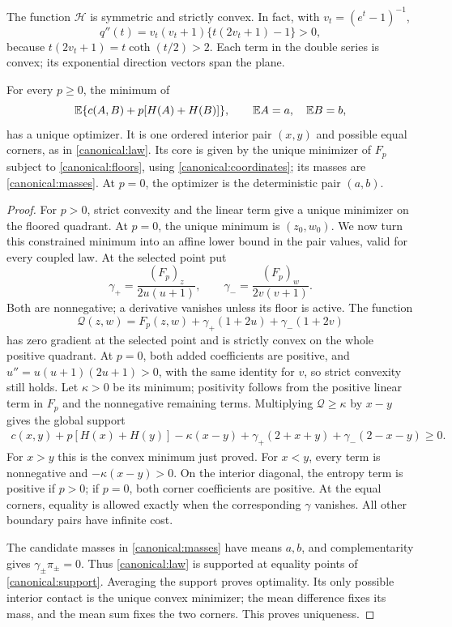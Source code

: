 The function $\mathcal H$ is symmetric and strictly convex.  In fact,
with $v_t=(e^t-1)^{-1}$,
\[
 q''(t)=v_t(v_t+1)\{t(2v_t+1)-1\}>0,
\]
because $t(2v_t+1)=t\coth(t/2)>2$.  Each term in the double series
is convex; its exponential direction vectors span the plane.

\begin{lemma}
\label{canonical:priced}
For every $p\ge0$, the minimum of
\[
 \mathbb E\{c(A,B)+p[H(A)+H(B)]\},
 \qquad \mathbb E A=a,\quad \mathbb E B=b,
\]
has a unique optimizer.  It is one ordered interior pair $(x,y)$
and possible equal corners, as in \eqref{canonical:law}. Its core is
given by the unique minimizer of $F_p$ subject to
\eqref{canonical:floors}, using \eqref{canonical:coordinates};
its masses are \eqref{canonical:masses}.
At $p=0$, the optimizer is the deterministic pair $(a,b)$.
\end{lemma}

\begin{proof}
For $p>0$, strict convexity and the linear term give a unique
minimizer on the floored quadrant.  At $p=0$, the unique minimum is
$(z_0,w_0)$. We now turn this constrained minimum into an affine
lower bound in the pair values, valid for every coupled law.
At the selected point put
\[
 \gamma_+=\frac{(F_p)_z}{2u(u+1)},\qquad
 \gamma_-=\frac{(F_p)_w}{2v(v+1)}.
\]
Both are nonnegative; a derivative vanishes unless its floor is active.
The function
\[
 \mathscr Q(z,w)=F_p(z,w)+\gamma_+(1+2u)+\gamma_-(1+2v)
\]
has zero gradient at the selected point and is strictly convex on the
whole positive quadrant.  At $p=0$, both added coefficients are
positive, and $u''=u(u+1)(2u+1)>0$, with the same identity for $v$,
so strict convexity still holds. Let $\kappa>0$ be its minimum;
positivity follows from the positive linear term in $F_p$ and the
nonnegative remaining terms.  Multiplying $\mathscr Q\ge\kappa$ by $x-y$ gives the
global support
\begin{equation}
\begin{split}
 c(x,y)+p[H(x)+H(y)]-\kappa(x-y)
 +\gamma_+(2+x+y)+\gamma_-(2-x-y)\ge0.
\end{split}
 \label{canonical:support}
\end{equation}
For $x>y$ this is the convex minimum just proved.  For $x<y$, every
term is nonnegative and $-\kappa(x-y)>0$.  On the interior diagonal,
the entropy term is positive if $p>0$; if $p=0$, both corner
coefficients are positive.  At the equal corners, equality is allowed
exactly when the corresponding $\gamma$ vanishes.  All other boundary
pairs have infinite cost.

The candidate masses in \eqref{canonical:masses} have means $a,b$,
and complementarity gives $\gamma_\pm\pi_\pm=0$.
Thus \eqref{canonical:law} is supported at equality points of
\eqref{canonical:support}.  Averaging the support proves optimality.
Its only possible interior contact is the unique convex minimizer;
the mean difference fixes its mass, and the mean sum fixes the two
corners.  This proves uniqueness.
\end{proof}

